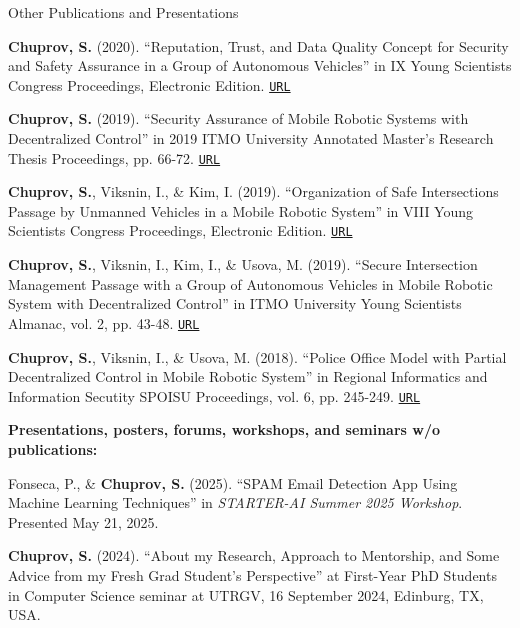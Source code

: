 \begin{rSection}{Other Publications and Presentations}
\begin{enumerate}[label=[O{{\arabic*}]}]
\item \textbf{Chuprov, S.} (2020). ``Reputation, Trust, and Data Quality Concept for Security and Safety Assurance in a Group of Autonomous Vehicles'' in IX Young Scientists Congress Proceedings, Electronic Edition. \href{https://kmu.itmo.ru/digests/article/3817}{\nolinkurl{URL}}

\item \textbf{Chuprov, S.} (2019). ``Security Assurance of Mobile Robotic Systems with Decentralized Control'' in 2019 ITMO University Annotated Master's Research Thesis Proceedings, pp. 66-72. \href{https://drive.google.com/file/d/1N9RQR0rh8hOYZR2xX7PoRvpitzYpxaru/view?usp=sharing}{\nolinkurl{URL}}

\item \textbf{Chuprov, S.}, Viksnin, I., \& Kim, I. (2019). ``Organization of Safe Intersections Passage by Unmanned Vehicles in a Mobile Robotic System'' in VIII Young Scientists Congress Proceedings, Electronic Edition. \href{https://kmu.itmo.ru/digests/article/209}{\nolinkurl{URL}}

\item \textbf{Chuprov, S.}, Viksnin, I., Kim, I., \& Usova, M. (2019). ``Secure Intersection Management Passage with a Group of Autonomous Vehicles in Mobile Robotic System with Decentralized Control'' in ITMO University Young Scientists Almanac, vol. 2, pp. 43-48. \href{https://research.itmo.ru/file/stat/194/almanah_tom_2_2019_(1).pdf}{\nolinkurl{URL}}

\item \textbf{Chuprov, S.}, Viksnin, I., \& Usova, M. (2018). ``Police Office Model with Partial Decentralized Control in Mobile Robotic System'' in Regional Informatics and Information Secutity SPOISU Proceedings, vol. 6, pp. 245-249. \href{http://spoisu.ru/files/riib/riib_6_2018.pdf}{\nolinkurl{URL}}
\end{enumerate}


\textbf{Presentations, posters, forums, workshops, and seminars w/o publications:}
\begin{enumerate}[label={[NP\arabic*]}, itemsep=-0.5em]

\item Fonseca, P., \& \textbf{Chuprov, S.} (2025). ``SPAM Email Detection App Using Machine Learning Techniques'' in \textit{STARTER-AI Summer 2025 Workshop}. Presented May 21, 2025.

\item \textbf{Chuprov, S.} (2024). ``About my Research, Approach to Mentorship, and Some Advice from my Fresh Grad Student’s Perspective'' at First-Year PhD Students in Computer Science seminar at UTRGV, 16 September 2024, Edinburg, TX, USA.


\end{enumerate}
\end{rSection}

